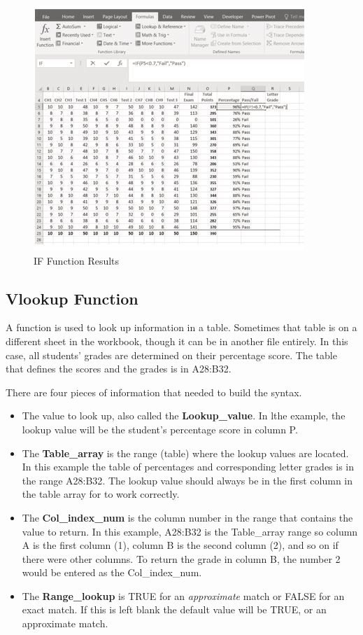 \begin{figure}[H]
	\centering
	\includegraphics[width=\maxwidth{.95\linewidth}]{gfx/ch03_fig11}
	\caption{IF Function Results}
	\label{03:fig11}
\end{figure}

\subsection{Vlookup Function}

A  function is used to look up information in a table. Sometimes that table is on a different sheet in the workbook, though it can be in another file entirely. In this case, all students' grades are determined on their percentage score. The table that defines the scores and the grades is in \textsf{A28:B32}.

There are four pieces of information that needed to build the  syntax. 

\begin{itemize}
	\item The value to look up, also called the \textbf{Lookup\_value}. In lthe example, the lookup value will be the student's percentage score in column P.
	\item The \textbf{Table\_array} is the range (table) where the lookup values are located. In this example the table of percentages and corresponding letter grades is in the range \textsf{A28:B32}. The lookup value should always be in the first column in the table array for  to work correctly. 
	\item The \textbf{Col\_index\_num} is the column number in the range that contains the value to return. In this example, \textsf{A28:B32} is the Table\_array range so column A is the first column (1), column B is the second column (2), and so on if there were other columns. To return the grade in column B, the number 2 would be entered as the Col\_index\_num.
	\item The \textbf{Range\_lookup} is TRUE for an \textit{approximate} match or FALSE for an exact match. If this is left blank the default value will be TRUE, or an approximate match.
\end{itemize}

